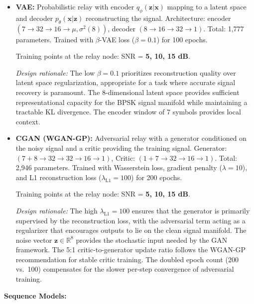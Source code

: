 \begin{itemize}
\item
  \textbf{VAE:} Probabilistic relay with encoder \(q_\phi(\mathbf{z}|\mathbf{x})\) mapping to a latent space and decoder \(p_\theta(\mathbf{x}|\mathbf{z})\) reconstructing the signal. Architecture: encoder \((7 \to 32 \to 16 \to \mu, \sigma^2(8))\), decoder \((8 \to 16 \to 32 \to 1)\). Total: 1,777 parameters. Trained with \(\beta\)-VAE loss (\(\beta=0.1\)) for 100 epochs.

  Training points at the relay node: SNR = \textbf{5, 10, 15 dB}.

  \emph{Design rationale:} The low \(\beta = 0.1\) prioritizes reconstruction quality over latent space regularization, appropriate for a task where accurate signal recovery is paramount. The 8-dimensional latent space provides sufficient representational capacity for the BPSK signal manifold while maintaining a tractable KL divergence. The encoder window of 7 symbols provides local context.
\item
  \textbf{CGAN (WGAN-GP):} Adversarial relay with a generator conditioned on the noisy signal and a critic providing the training signal. Generator: \((7+8 \to 32 \to 32 \to 16 \to 1)\), Critic: \((1+7 \to 32 \to 16 \to 1)\). Total: 2,946 parameters. Trained with Wasserstein loss, gradient penalty (\(\lambda=10\)), and L1 reconstruction loss (\(\lambda_{\text{L1}}=100\)) for 200 epochs.

  Training points at the relay node: SNR = \textbf{5, 10, 15 dB}.

  \emph{Design rationale:} The high \(\lambda_{\text{L1}} = 100\) ensures that the generator is primarily supervised by the reconstruction loss, with the adversarial term acting as a regularizer that encourages outputs to lie on the clean signal manifold. The noise vector \(\mathbf{z} \in \mathbb{R}^8\) provides the stochastic input needed by the GAN framework. The 5:1 critic-to-generator update ratio follows the WGAN-GP recommendation for stable critic training. The doubled epoch count (200 vs.~100) compensates for the slower per-step convergence of adversarial training.
\end{itemize}

\textbf{Sequence Models:}

